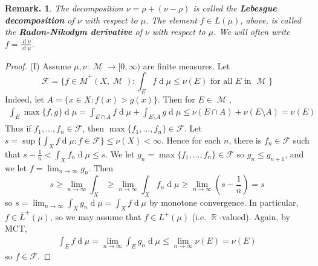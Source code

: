 \documentclass[11pt, a4paper]{memoir}
\DeclareMathOperator{\R}{{\mathbb{R}}}
\newcommand{\ol}[1]{\ensuremath{\overline{#1}}}
\theoremstyle{change}
\theoremstyle{plain}
\theoremstyle{nonumberplain}
\newtheorem{remark}{Remark.}
\newtheorem{proof}{Proof}
\DeclareMathOperator{\M}{{\mathcal{M}}}
\renewcommand{\d}[1]{\ensuremath{\operatorname{d}\!{#1}}}
\numberwithin{equation}{section}
\begin{document}
\begin{remark}
    The decomposition $\nu=\rho+(\nu-\rho)$ is called the \textbf{Lebesgue decomposition} of $\nu$ with respect to $\mu$.
    The element $f\in L(\mu)$, above, is called the \textbf{Radon-Nikodym derivative} of $\nu$ with respect to $\mu$.
    We will often write $f=\frac{\d{\nu}}{\d{\mu}}$.
\end{remark}
\begin{proof}
    (I) Assume $\mu,\nu:\M\to[0,\infty)$ are finite measures.
    Let
    \begin{equation*}
        \mathcal{F}=\{f\in\ol{M}^+(X,\M):\int_E f\d{\mu}\leq\nu(E)\text{ for all $E$ in $\M$}\}
    \end{equation*}
    Indeed, let $A=\{x\in X:f(x)>g(x)\}$.
    Then for $E\in\M$,
    \begin{align*}
        \int_E\max\{f,g\}\d{\mu}=\int_{E\cap A}f\d{\mu}+\int_{E\setminus A} g\d{\mu}\leq \nu(E\cap A)+\nu(E\setminus A)=\nu(E)
    \end{align*}
    Thus if $f_1,\ldots,f_n\in\mathcal{F}$, then $\max\{f_1,\ldots,f_n\}\in\mathcal{F}$.
    Let $s=\sup\{\int_X f\d{\mu}:f\in\mathcal{F}\}\leq\nu(X)<\infty$.
    Hence for each $n$, there is $f_n\in\mathcal{F}$ such that $s-\frac{1}{n}<\int_X f_n\d{\mu}\leq s$.
    We let $g_n=\max\{f_1,\ldots,f_n\}\in\mathcal{F}$ so $g_n\leq g_{n+1}$, and we let $f=\lim_{n\to\infty}g_n$.
    Then
    \begin{equation*}
        s\geq\lim_{n\to\infty}\int_X \geq\lim_{n\to\infty}\int_X f_n\d{\mu}\geq\lim_{n\to\infty}\left(s-\frac{1}{n}\right)=s
    \end{equation*}
    so $s=\lim_{n\to\infty}\int_X g_n\d{\mu}=\int_X f\d{\mu}$ by monotone convergence.
    In particular, $f\in\ol{L}^+(\mu)$, so we may assume that $f\in L^+(\mu)$ (i.e. $\R$-valued).
    Again, by MCT,
    \begin{align*}
        \int_E f\d{\mu}=\lim_{n\to\infty}\int_E g_n\d{\mu}\leq\lim_{n\to\infty}\nu(E)=\nu(E)
    \end{align*}
    so $f\in\mathcal{F}$.


\end{proof}
\end{document}
